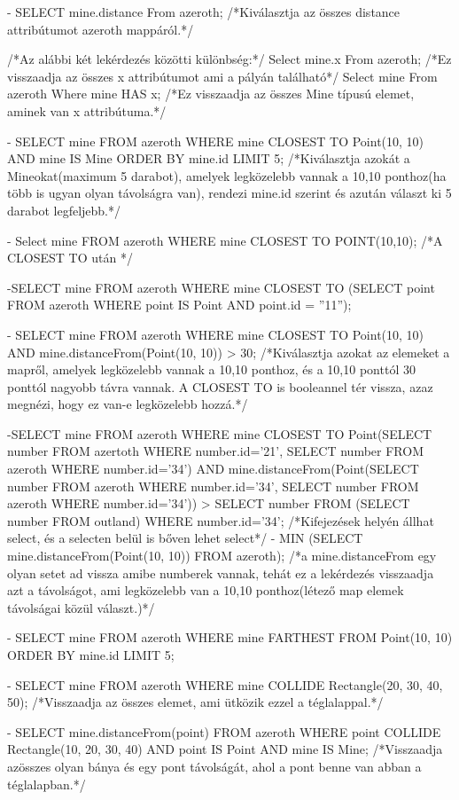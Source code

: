 - SELECT mine.distance From azeroth;   /*Kiválasztja az összes distance attribútumot azeroth mappáról.*/

/*Az alábbi két lekérdezés közötti különbség:*/
Select mine.x From azeroth;  /*Ez visszaadja az összes x attribútumot ami a pályán található*/
Select mine From azeroth Where mine HAS x;  /*Ez visszaadja az összes Mine típusú elemet, aminek van x attribútuma.*/

- SELECT mine
FROM azeroth
WHERE mine CLOSEST TO Point(10, 10) AND mine IS Mine
ORDER BY mine.id
LIMIT 5;
/*Kiválasztja azokát a Mineokat(maximum 5 darabot), amelyek legközelebb vannak a 10,10 ponthoz(ha több is ugyan olyan távolságra van), 
rendezi mine.id szerint és azután választ ki 5 darabot legfeljebb.*/

- Select mine
FROM azeroth
WHERE mine CLOSEST TO POINT(10,10);
/*A CLOSEST TO után */

-SELECT mine
FROM azeroth
WHERE mine CLOSEST TO (SELECT point FROM azeroth WHERE point IS Point AND point.id = ”11”);

- SELECT mine
FROM azeroth
WHERE mine CLOSEST TO Point(10, 10) AND mine.distanceFrom(Point(10, 10)) > 30;
/*Kiválasztja azokat az elemeket a mapről, amelyek legközelebb vannak a 10,10 ponthoz, és a 10,10 ponttól 30 ponttól nagyobb távra vannak.
A CLOSEST TO is booleannel tér vissza, azaz megnézi, hogy ez van-e legközelebb hozzá.*/

-SELECT mine
FROM azeroth
WHERE mine CLOSEST TO Point(SELECT number FROM azertoth WHERE number.id='21', SELECT number FROM azeroth WHERE number.id='34')
 AND mine.distanceFrom(Point(SELECT number FROM azeroth WHERE number.id='34', SELECT number FROM azeroth WHERE number.id='34')) > SELECT number FROM (SELECT number FROM outland) WHERE number.id='34';
/*Kifejezések helyén állhat select, és a selecten belül is bőven lehet select*/
- MIN (SELECT mine.distanceFrom(Point(10, 10)) FROM azeroth);
/*a mine.distanceFrom egy olyan setet ad vissza amibe numberek vannak, tehát ez a lekérdezés visszaadja azt a távolságot, ami legközelebb van
a 10,10 ponthoz(létező map elemek távolságai közül választ.)*/

- SELECT mine
FROM azeroth
WHERE mine FARTHEST FROM Point(10, 10)
ORDER BY mine.id
LIMIT 5;

- SELECT mine
FROM azeroth
WHERE mine COLLIDE Rectangle(20, 30, 40, 50);
/*Visszaadja az összes elemet, ami ütközik ezzel a téglalappal.*/

- SELECT mine.distanceFrom(point)
FROM azeroth
WHERE
point COLLIDE Rectangle(10, 20, 30, 40) AND
point IS Point AND
mine IS Mine;
/*Visszaadja azösszes olyan bánya és egy pont távolságát, ahol a pont benne van abban a téglalapban.*/

